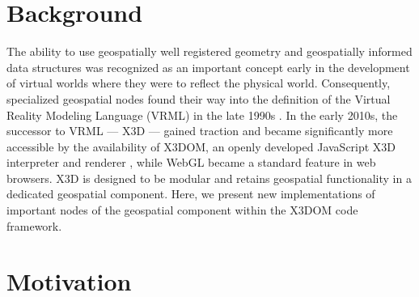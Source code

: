 \documentclass[review]{acmsiggraph}            %
\begin{document}

\begin{CRcatlist}  \end{CRcatlist}

\keywordlist

\section{Background}


\copyrightspace

The ability to use geospatially well registered geometry and geospatially informed data structures
was recognized as an important concept early in the development of virtual worlds where they were to
reflect the physical world. Consequently, specialized geospatial nodes found their way into the
definition of the Virtual Reality Modeling Language (VRML) in the late 1990s \cite{reddy2000}. In
the early 2010s, the successor to VRML --- X3D --- gained traction and became significantly more
accessible by the availability of X3DOM, an openly developed JavaScript X3D interpreter and renderer
\cite{behr09}, while WebGL became a standard feature in web browsers. X3D is designed to be modular
\cite{x3d05} and retains geospatial functionality in a dedicated geospatial component. Here, we
present new implementations of important nodes of the geospatial component within the X3DOM code
framework.


\section{Motivation}
\end{document}
